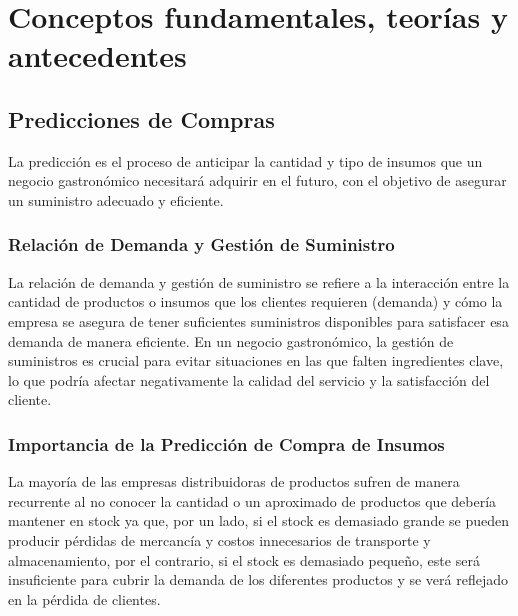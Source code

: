 \fancyhead{}
\fancyfoot{}
\newtheorem{teorema}{Teorema}
\cfoot{\thepage}


\chapter{Conceptos fundamentales, teorías y antecedentes}

\section{Predicciones de Compras}

La predicción es el proceso de anticipar la cantidad y tipo de insumos que un negocio gastronómico necesitará adquirir en el futuro, con el objetivo de asegurar un suministro adecuado y eficiente.


\subsection{Relación de Demanda y Gestión de Suministro}

La relación de demanda y gestión de suministro se refiere a la interacción entre la cantidad de productos o insumos que los clientes requieren (demanda) y cómo la empresa se asegura de tener suficientes suministros disponibles para satisfacer esa demanda de manera eficiente. En un negocio gastronómico, la gestión de suministros es crucial para evitar situaciones en las que falten ingredientes clave, lo que podría afectar negativamente la calidad del servicio y la satisfacción del cliente.


\subsection{Importancia de la Predicción de Compra de Insumos}

La mayoría de las empresas distribuidoras de productos sufren de manera recurrente al no conocer la cantidad o un aproximado de productos que debería mantener en stock ya que, por un lado, si el stock es demasiado grande se pueden producir pérdidas de mercancía y costos innecesarios de transporte y almacenamiento, por el contrario, si el stock es demasiado pequeño, este será insuficiente para cubrir la demanda de los diferentes productos y se verá reflejado en la pérdida de clientes\cite{romero2021prediccion}. 

